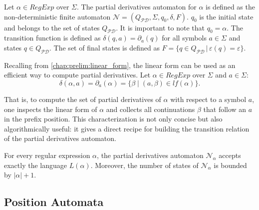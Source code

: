 \begin{defn}
	Let $\alpha \in RegExp$ over $\Sigma$. The partial derivatives automaton for $\alpha$ is defined as the non-deterministic finite automaton $\mathcal{N} = (Q_{\mathcal{PD}}, \Sigma, q_0, \delta, F)$. $q_0$ is the initial state and belongs to the set of states $Q_{\mathcal{PD}}$. It is important to note that $q_0 = \alpha$. The transition function is defined as $\delta(q,a) = \partial_a(q)$ for all symbols $a \in \Sigma$ and states $q \in Q_{\mathcal{PD}}$. The set of final states is defined as $F = \{ q \in Q_{\mathcal{PD}} \, | \, \varepsilon(q) = \varepsilon \}$.
\end{defn}

Recalling from \ref{chap:prelim:linear_form}, the linear form can be used as an efficient way to compute partial derivatives.
Let $\alpha \in RegExp$ over $\Sigma$ and $a \in \Sigma$:
\[
\delta(\alpha, a) = \partial_a(\alpha) = \{ \beta \mid (a,\beta) \in lf(\alpha) \}.
\]

That is, to compute the set of partial derivatives of $\alpha$ with respect to a symbol $a$, one inspects the linear form of $\alpha$ and collects all continuations $\beta$ that follow an $a$ in the prefix position. This characterization is not only concise but also algorithmically useful: it gives a direct recipe for building the transition relation of the partial derivatives automaton.

\begin{thm}
	For every regular expression $\alpha$, the partial derivatives automaton $\mathcal{N}_\alpha$ accepts exactly the language $L(\alpha)$. Moreover, the number of states of $\mathcal{N}_\alpha$ is bounded by $|\alpha|+1$.
\end{thm}



\subsection{Position Automata}


